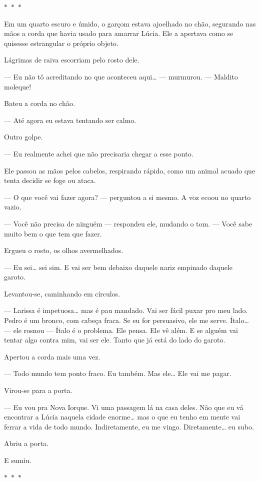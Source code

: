 \begin{center}
$\ast$~$\ast$~$\ast$
\end{center}

Em um quarto escuro e úmido, o garçom estava ajoelhado no chão, segurando nas mãos a corda que havia usado para amarrar Lúcia. Ele a apertava como se quisesse estrangular o próprio objeto.

Lágrimas de raiva escorriam pelo rosto dele.

— Eu não tô acreditando no que aconteceu aqui… — murmurou. — Maldito moleque!

Bateu a corda no chão.

— Até agora eu estava tentando ser calmo.

Outro golpe.

— Eu realmente achei que não precisaria chegar a esse ponto.

Ele passou as mãos pelos cabelos, respirando rápido, como um animal acuado que tenta decidir se foge ou ataca.

— O que você vai fazer agora? — perguntou a si mesmo. A voz ecoou no quarto vazio.

— Você não precisa de ninguém — respondeu ele, mudando o tom. — Você sabe muito bem o que tem que fazer.

Ergueu o rosto, os olhos avermelhados.

— Eu sei… sei sim. E vai ser bem debaixo daquele nariz empinado daquele garoto.

Levantou-se, caminhando em círculos.

— Larissa é impetuosa… mas é pau mandado. Vai ser fácil puxar pro meu lado. Pedro é um bronco, com cabeça fraca. Se eu for persuasivo, ele me serve.  
Ítalo… — ele rosnou — Ítalo é o problema. Ele pensa. Ele vê além. E se alguém vai tentar algo contra mim, vai ser ele. Tanto que já está do lado do garoto.

Apertou a corda mais uma vez.

— Todo mundo tem ponto fraco.  
Eu também.  
Mas ele…  
Ele vai me pagar.

Virou-se para a porta.

— Eu vou pra Nova Iorque. Vi uma passagem lá na casa deles. Não que eu vá encontrar a Lúcia naquela cidade enorme… mas o que eu tenho em mente vai ferrar a vida de todo mundo.  
Indiretamente, eu me vingo.  
Diretamente… eu subo.

Abriu a porta.

E sumiu.

\begin{center}
$\ast$~$\ast$~$\ast$
\end{center}

